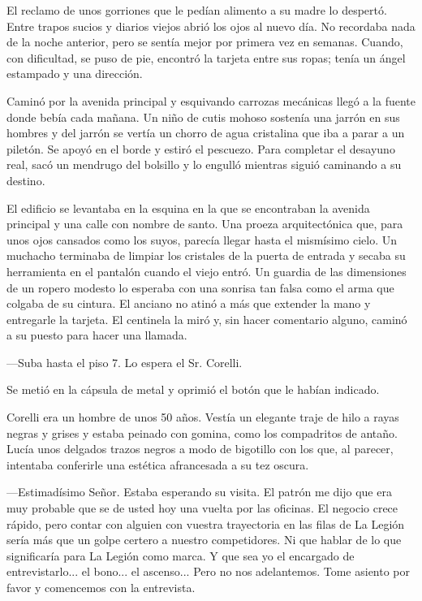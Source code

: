 \documentclass[11pt,twoside,openright,a5paper]{book}
\begin{document}
El reclamo de unos gorriones que le pedían alimento a su madre lo despertó. Entre trapos sucios y diarios viejos abrió los ojos al nuevo día. No recordaba nada de la noche anterior, pero se sentía mejor por primera vez en semanas. Cuando, con dificultad, se puso de pie, encontró la tarjeta entre sus ropas; tenía un ángel estampado y una dirección.

Caminó por la avenida principal y esquivando carrozas mecánicas llegó a la fuente donde bebía cada mañana. Un niño de cutis mohoso sostenía una jarrón en sus hombres y del jarrón se vertía un chorro de agua cristalina que iba a parar a un piletón. Se apoyó en el borde y estiró el pescuezo. Para completar el desayuno real, sacó un mendrugo del bolsillo y lo engulló mientras siguió caminando a su destino.

El edificio se levantaba en la esquina en la que se encontraban la avenida principal y una calle con nombre de santo. Una proeza arquitectónica que, para unos ojos cansados como los suyos, parecía llegar hasta el mismísimo cielo. Un muchacho terminaba de limpiar los cristales de la puerta de entrada y secaba su herramienta en el pantalón cuando el viejo entró. Un guardia de las dimensiones de un ropero modesto lo esperaba con una sonrisa tan falsa como el arma que colgaba de su cintura. El anciano no atinó a más que extender la mano y entregarle la tarjeta. El centinela la miró y, sin hacer comentario alguno, caminó a su puesto para hacer una llamada.

---Suba hasta el piso 7. Lo espera el Sr. Corelli.

Se metió en la cápsula de metal y oprimió el botón que le habían indicado.

Corelli era un hombre de unos 50 años. Vestía un elegante traje de hilo a rayas negras y grises y estaba peinado con gomina, como los compadritos de antaño. Lucía unos delgados trazos negros a modo de bigotillo con los que, al parecer, intentaba conferirle una estética afrancesada a su tez oscura.

---Estimadísimo Señor. Estaba esperando su visita. El patrón me dijo que era muy probable que se de usted hoy una vuelta por las oficinas. El negocio crece rápido, pero contar con alguien con vuestra trayectoria en las filas de La Legión sería más que un golpe certero a nuestro competidores. Ni que hablar de lo que significaría para La Legión como marca. Y que sea yo el encargado de entrevistarlo... el bono... el ascenso... Pero no nos adelantemos. Tome asiento por favor y comencemos con la entrevista.
\end{document}
